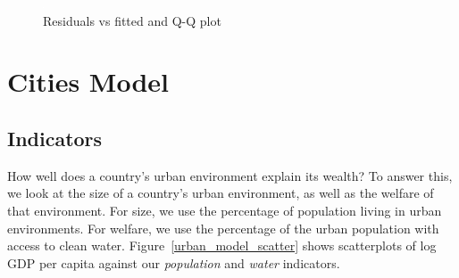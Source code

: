\documentclass[11pt]{article}
\begin{document}
\begin{figure}[!ht]
  \centering
  \includegraphics[width=\textwidth]{images/climate_model_conditions}
  \caption{\label{climate_model_conditions}Residuals vs fitted and Q-Q plot}
\end{figure}












\section{Cities Model}
\label{sec:model_urban}

\subsection{Indicators}
How well does a country's urban environment explain its wealth? To answer this, we look at the size of a country's urban environment, as well as the welfare of that environment.
For size, we use the percentage of population living in urban environments.
For welfare, we use the percentage of the urban population with access to clean water. Figure~\ref{urban_model_scatter} shows scatterplots of log GDP per capita against our \emph{population} and \emph{water} indicators.
\end{document}

